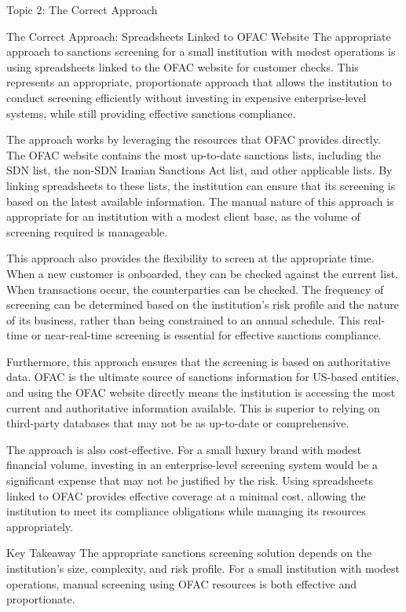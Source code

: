\documentclass[5pt]{beamer}
\begin{document}
	\begin{frame}{Topic 2: The Correct Approach}
		\begin{block}{\tiny The Correct Approach: Spreadsheets Linked to OFAC Website}
			\tiny The appropriate approach to sanctions screening for a small institution with modest operations is using spreadsheets linked to the OFAC website for customer checks. This represents an appropriate, proportionate approach that allows the institution to conduct screening efficiently without investing in expensive enterprise-level systems, while still providing effective sanctions compliance.
			
			The approach works by leveraging the resources that OFAC provides directly. The OFAC website contains the most up-to-date sanctions lists, including the SDN list, the non-SDN Iranian Sanctions Act list, and other applicable lists. By linking spreadsheets to these lists, the institution can ensure that its screening is based on the latest available information. The manual nature of this approach is appropriate for an institution with a modest client base, as the volume of screening required is manageable.
			
			This approach also provides the flexibility to screen at the appropriate time. When a new customer is onboarded, they can be checked against the current list. When transactions occur, the counterparties can be checked. The frequency of screening can be determined based on the institution's risk profile and the nature of its business, rather than being constrained to an annual schedule. This real-time or near-real-time screening is essential for effective sanctions compliance.
			
			Furthermore, this approach ensures that the screening is based on authoritative data. OFAC is the ultimate source of sanctions information for US-based entities, and using the OFAC website directly means the institution is accessing the most current and authoritative information available. This is superior to relying on third-party databases that may not be as up-to-date or comprehensive.
			
			The approach is also cost-effective. For a small luxury brand with modest financial volume, investing in an enterprise-level screening system would be a significant expense that may not be justified by the risk. Using spreadsheets linked to OFAC provides effective coverage at a minimal cost, allowing the institution to meet its compliance obligations while managing its resources appropriately.
		\end{block}
		
		\begin{alertblock}{Key Takeaway}
			\tiny The appropriate sanctions screening solution depends on the institution's size, complexity, and risk profile. For a small institution with modest operations, manual screening using OFAC resources is both effective and proportionate.
		\end{alertblock}
	\end{frame}
	
\end{document}
